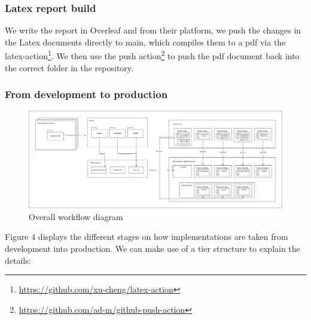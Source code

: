 \documentclass[report/main.tex]{subfiles}
\begin{document}
        \subsubsection{Latex report build}
        
        We write the report in Overleaf and from their platform, we push the changes in the Latex documents directly to main, which compiles them to a pdf via the latex-action\footnote{\hyperlink{latex compiler action}{https://github.com/xu-cheng/latex-action}}. We then use the push action\footnote{\hyperlink{push action}{https://github.com/ad-m/github-push-action}} to push the pdf document back into the correct folder in the repository. 
        
        
        \subsubsection{From development to production}
        
        \begin{figure}[H]
            \centering
                \includegraphics[width=\textwidth]{report/images/MiniTwit-workflow-final.png}
                \caption{Overall workflow diagram}
            \label{fig:overall_workflow}
        \end{figure}
        
        Figure 4 displays the different stages on how implementations are taken from development into production. We can make use of a tier structure to explain the details:
        
\end{document}
